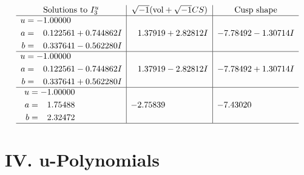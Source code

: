 \documentclass[1p]{elsarticle_modified}
\theoremstyle{definition}
\newcommand{\I}{\sqrt{-1}}
\begin{document}
$$\begin{array}{c|c|c}  
\text{Solutions to }I^u_{3}& \I (\text{vol} + \sqrt{-1}CS) & \text{Cusp shape}\\
 \hline 
\begin{aligned}
u &= -1.00000\phantom{ +0.000000I} \\
a &= \phantom{-}0.122561 + 0.744862 I \\
b &= \phantom{-}0.337641 - 0.562280 I\end{aligned}
 & \phantom{-}1.37919 + 2.82812 I & -7.78492 - 1.30714 I \\ \hline\begin{aligned}
u &= -1.00000\phantom{ +0.000000I} \\
a &= \phantom{-}0.122561 - 0.744862 I \\
b &= \phantom{-}0.337641 + 0.562280 I\end{aligned}
 & \phantom{-}1.37919 - 2.82812 I & -7.78492 + 1.30714 I \\ \hline\begin{aligned}
u &= -1.00000\phantom{ +0.000000I} \\
a &= \phantom{-}1.75488\phantom{ +0.000000I} \\
b &= \phantom{-}2.32472\phantom{ +0.000000I}\end{aligned}
 & -2.75839\phantom{ +0.000000I} & -7.43020\phantom{ +0.000000I}\\
 \hline 
 \end{array}$$\newpage
\newpage\renewcommand{\arraystretch}{1}
\centering \section*{ IV. u-Polynomials}
\end{document}
